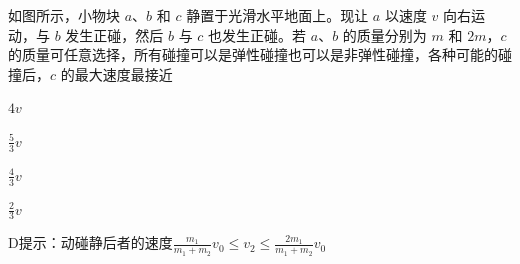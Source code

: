 如图所示，小物块 \(a\)、\(b\) 和 \(c\) 静置于光滑水平地面上。现让 \(a\) 以速度 \(v\) 向右运动，与 \(b\) 发生正碰，然后 \(b\) 与 \(c\) 也发生正碰。若 \(a\)、\(b\) 的质量分别为 \(m\) 和 \(2m\)，\(c\) 的质量可任意选择，所有碰撞可以是弹性碰撞也可以是非弹性碰撞，各种可能的碰撞后，\(c\) 的最大速度最接近\paren[]
	
\begin{choices}
	\item \(4v\)
	\item \(\frac{5}{3}v\)
	\item \(\frac{4}{3}v\)
	\item \(\frac{2}{3}v\)
\end{choices}
\begin{answer}
   D\qquad 提示：动碰静后者的速度\(\frac{m_1}{m_1 + m_2}v_0\le v_2\le \frac{2m_1}{m_1 + m_2}v_0\) 
\end{answer}
